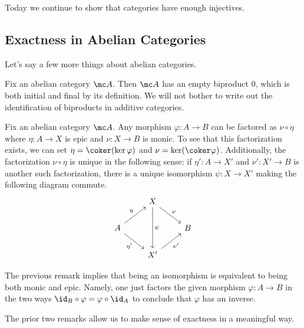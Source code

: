 \documentclass[../notes.tex]{subfiles}
\begin{document}
Today we continue to show that categories have enough injectives.

\subsection{Exactness in Abelian Categories}
Let's say a few more things about abelian categories.
\begin{example}
	Fix an abelian category $\mc A$. Then $\mc A$ has an empty biproduct $0$, which is both initial and final by its definition. We will not bother to write out the identification of biproducts in additive categories.
\end{example}
\begin{remark}
	Fix an abelian category $\mc A$. Any morphism $\varphi\colon A\to B$ can be factored as $\nu\circ\eta$ where $\eta\colon A\to X$ is epic and $\nu\colon X\to B$ is monic. To see that this factorization exists, we can set $\eta=\coker(\ker\varphi)$ and $\nu=\ker(\coker\varphi)$. Additionally, the factorization $\nu\circ\eta$ is unique in the following sense: if $\eta'\colon A\to X'$ and $\nu'\colon X'\to B$ is another such factorization, there is a unique isomorphism $\psi\colon X\to X'$ making the following diagram commute.
	\[\begin{tikzcd}
		& X \\
		A && B \\
		& {X'}
		\arrow["{\eta'}"', from=2-1, to=3-2]
		\arrow["\eta", from=2-1, to=1-2]
		\arrow["\nu", from=1-2, to=2-3]
		\arrow["{\nu'}"', from=3-2, to=2-3]
		\arrow["\psi", from=1-2, to=3-2]
	\end{tikzcd}\]
\end{remark}
\begin{remark}
	The previous remark implies that being an isomorphism is equivalent to being both monic and epic. Namely, one just factors the given morphism $\varphi\colon A\to B$ in the two ways ${\id_B}\circ\varphi=\varphi\circ\id_A$ to conclude that $\varphi$ has an inverse.
\end{remark}
The prior two remarks allow us to make sense of exactness in a meaningful way.
\end{document}
